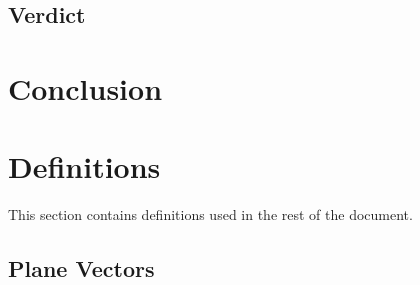 \documentclass[a4paper]{article}
\begin{document}
		\subsection{Verdict}
		\label{section:verdict}


	\section{Conclusion}
	\label{section:conclusion}



	\clearpage

	\appendix

	\section{Definitions}
	\label{section:definitions}

		This section contains definitions used in the rest of the document.

		\subsection{Plane Vectors}
		\label{section:plane_vectors}
\end{document}
